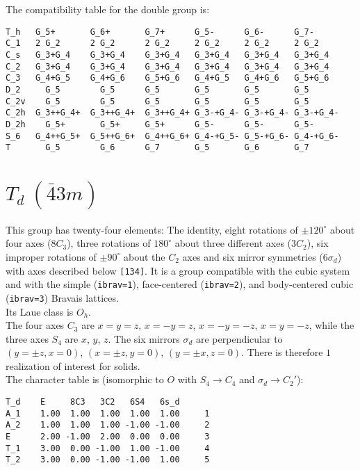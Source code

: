 \documentclass[12pt,a4paper,twoside]{report}
\begin{document}
The compatibility table for the double group is:

\begin{tcolorbox}
\begin{footnotesize}
\begin{verbatim}
T_h   G_5+       G_6+       G_7+      G_5-      G_6-      G_7-
C_1   2 G_2      2 G_2      2 G_2     2 G_2     2 G_2     2 G_2
C_s   G_3+G_4    G_3+G_4    G_3+G_4   G_3+G_4   G_3+G_4   G_3+G_4
C_2   G_3+G_4    G_3+G_4    G_3+G_4   G_3+G_4   G_3+G_4   G_3+G_4
C_3   G_4+G_5    G_4+G_6    G_5+G_6   G_4+G_5   G_4+G_6   G_5+G_6
D_2     G_5        G_5      G_5       G_5       G_5       G_5
C_2v    G_5        G_5      G_5       G_5       G_5       G_5
C_2h  G_3++G_4+  G_3++G_4+  G_3++G_4+ G_3-+G_4- G_3-+G_4- G_3-+G_4-
D_2h    G_5+       G_5+     G_5+      G_5-      G_5-      G_5-
S_6   G_4++G_5+  G_5++G_6+  G_4++G_6+ G_4-+G_5- G_5-+G_6- G_4-+G_6-
T       G_5        G_6      G_7       G_5       G_6       G_7
\end{verbatim}
\end{footnotesize}
\end{tcolorbox}

\newpage
{\color{coral}\section{$T_d\ (\bar 43m)$}}
\color{black}
This group has twenty-four elements: The identity, eight rotations 
of $\pm120^\circ$ about four axes ($8C_3$), three rotations of 
$180^\circ$ about three different axes ($3C_2$), six
improper rotations of $\pm90^\circ$ about the $C_2$ axes and
six mirror symmetries ($6\sigma_d$) with axes described below \texttt{[134]}.
It is a group compatible with the cubic system and with the  
simple (\texttt{ibrav=1}), face-centered (\texttt{ibrav=2}), 
and body-centered cubic (\texttt{ibrav=3}) Bravais lattices. \\
Its Laue class is $O_{h}$. \\
The four axes $C_3$ are $x=y=z$, $x=-y=z$, $x=-y=-z$, $x=y=-z$, while
the three axes $S_4$ are $x$, $y$, $z$. 
The six mirrors $\sigma_d$ are perpendicular to $(y=\pm z, x=0)$,
$(x=\pm z, y=0)$, $(y=\pm x, z=0)$.
There is therefore $1$ realization of interest for solids. \\
The character table is (isomorphic to $O$ with $S_4 \rightarrow C_4$ and
$\sigma_d \rightarrow C_2'$):

\begin{tcolorbox}
\begin{footnotesize}
\begin{verbatim}
T_d    E     8C3   3C2   6S4   6s_d
A_1    1.00  1.00  1.00  1.00  1.00     1
A_2    1.00  1.00  1.00 -1.00 -1.00     2
E      2.00 -1.00  2.00  0.00  0.00     3
T_1    3.00  0.00 -1.00  1.00 -1.00     4
T_2    3.00  0.00 -1.00 -1.00  1.00     5
\end{verbatim}
\end{footnotesize}
\end{tcolorbox}
\end{document}
